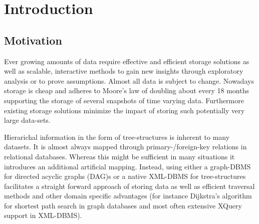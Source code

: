\section{Introduction}\label{sec::introduction}
\subsection{Motivation}
Ever growing amounts of data require effective and efficient storage solutions as well as scalable, interactive methods to gain new insights through exploratory analysis or to prove assumptions. Almost all data is subject to change. Nowadays storage is cheap and adheres to Moore's law\cite{MOORE} of doubling about every 18 months supporting the storage of several snapshots of time varying data. Furthermore existing storage solutions minimize the impact of storing such potentially very large data-sets.

Hierarichal information in the form of tree-structures is inherent to many datasets. It is almost always mapped through primary-/foreign-key relations in relational databases. Whereas this might be sufficient in many situations it introduces an additional artificial mapping. Instead, using either a graph-DBMS for directed acyclic graphs (DAG)s or a native XML-DBMS for tree-structures facilitates a straight forward approach of storing data as well as efficient traversal methods and other domain specific advantages (for instance Dijkstra's algorithm for shortest path search in graph databases and most often extensive XQuery support in XML-DBMS).

